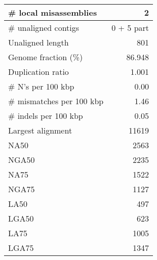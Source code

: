 \documentclass[12pt,a4paper]{article}
\begin{document}
\begin{table}[ht]
\begin{center}
\begin{tabular}{|l*{1}{|r}|}
\# local misassemblies & 2 \\ \hline
\# unaligned contigs & 0 + 5 part \\ \hline
Unaligned length & 801 \\ \hline
Genome fraction (\%) & 86.948 \\ \hline
Duplication ratio & 1.001 \\ \hline
\# N's per 100 kbp & 0.00 \\ \hline
\# mismatches per 100 kbp & 1.46 \\ \hline
\# indels per 100 kbp & 0.05 \\ \hline
Largest alignment & 11619 \\ \hline
NA50 & 2563 \\ \hline
NGA50 & 2235 \\ \hline
NA75 & 1522 \\ \hline
NGA75 & 1127 \\ \hline
LA50 & 497 \\ \hline
LGA50 & 623 \\ \hline
LA75 & 1005 \\ \hline
LGA75 & 1347 \\ \hline
\end{tabular}
\end{center}
\end{table}
\end{document}
